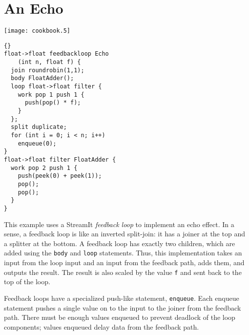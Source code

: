 \clearpage
\section{An Echo}

\begin{textpic}{\texttt{[image: cookbook.5]}}
\begin{lstlisting}{}
float->float feedbackloop Echo
    (int n, float f) {
  join roundrobin(1,1);
  body FloatAdder();
  loop float->float filter {
    work pop 1 push 1 {
      push(pop() * f);
    }
  };
  split duplicate;
  for (int i = 0; i < n; i++)
    enqueue(0);
}
float->float filter FloatAdder {
  work pop 2 push 1 {
    push(peek(0) + peek(1));
    pop();
    pop();
  }
}
\end{lstlisting}
\end{textpic}

This example uses a StreamIt \emph{feedback loop} to implement an echo
effect.  In a sense, a feedback loop is like an inverted split-join:
it has a joiner at the top and a splitter at the bottom.  A feedback
loop has exactly two children, which are added using the \lstinline|body|
and \lstinline|loop| statements.  Thus, this implementation takes an
input from the loop input and an input from the feedback path, adds
them, and outputs the result.  The result is also scaled by the value
\lstinline|f| and sent back to the top of the loop.

Feedback loops have a specialized push-like statement,
\lstinline|enqueue|.  Each enqueue statement pushes a single value on
to the input to the joiner from the feedback path.  There must be
enough values enqueued to prevent deadlock of the loop components;
values enqueued delay data from the feedback path.


